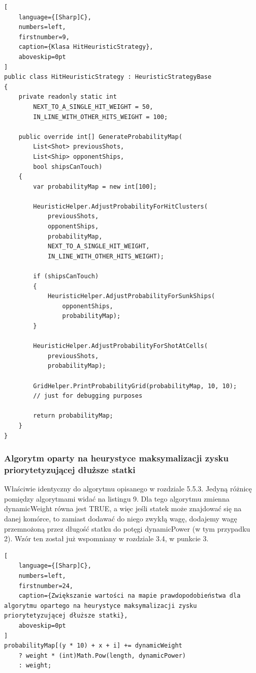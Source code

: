 \begin{addmargin}[10mm]{0mm}
\begin{lstlisting}[
    language={[Sharp]C},
    numbers=left,
    firstnumber=9,
    caption={Klasa HitHeuristicStrategy},
    aboveskip=0pt
]
public class HitHeuristicStrategy : HeuristicStrategyBase
{
    private readonly static int
        NEXT_TO_A_SINGLE_HIT_WEIGHT = 50,
        IN_LINE_WITH_OTHER_HITS_WEIGHT = 100;

    public override int[] GenerateProbabilityMap(
        List<Shot> previousShots,
        List<Ship> opponentShips,
        bool shipsCanTouch)
    {
        var probabilityMap = new int[100];

        HeuristicHelper.AdjustProbabilityForHitClusters(
            previousShots,
            opponentShips,
            probabilityMap,
            NEXT_TO_A_SINGLE_HIT_WEIGHT,
            IN_LINE_WITH_OTHER_HITS_WEIGHT);

        if (shipsCanTouch)
        {
            HeuristicHelper.AdjustProbabilityForSunkShips(
                opponentShips,
                probabilityMap);
        }

        HeuristicHelper.AdjustProbabilityForShotAtCells(
            previousShots,
            probabilityMap);

        GridHelper.PrintProbabilityGrid(probabilityMap, 10, 10);
        // just for debugging purposes

        return probabilityMap;
    }
}

\end{lstlisting}
\end{addmargin}

\subsubsection{Algorytm oparty na heurystyce maksymalizacji zysku priorytetyzującej dłuższe statki}
Właściwie identyczny do algorytmu opisanego w rozdziale 5.5.3. Jedyną różnicę pomiędzy algorytmami widać na listingu 9. Dla tego algorytmu zmienna dynamicWeight równa jest TRUE, a więc jeśli statek może znajdować się na danej komórce, to zamiast dodawać do niego zwykłą wagę, dodajemy wagę przemnożoną przez długość statku do potęgi dynamicPower (w tym przypadku 2). Wzór ten został już wspomniany w rozdziale 3.4, w punkcie 3.

\begin{addmargin}[10mm]{0mm}
\begin{lstlisting}[
    language={[Sharp]C},
    numbers=left,
    firstnumber=24,
    caption={Zwiększanie wartości na mapie prawdopodobieństwa dla algorytmu opartego na heurystyce maksymalizacji zysku priorytetyzującej dłuższe statki},
    aboveskip=0pt
]
probabilityMap[(y * 10) + x + i] += dynamicWeight
    ? weight * (int)Math.Pow(length, dynamicPower)
    : weight;
\end{lstlisting}
\end{addmargin}

